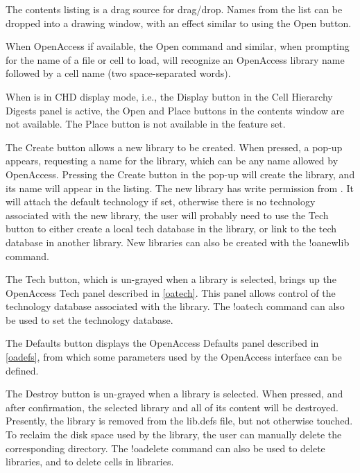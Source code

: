 The contents listing is a drag source for drag/drop.  Names from the
list can be dropped into a drawing window, with an effect similar to
using the {\cb Open} button.

When OpenAccess if available, the {\cb Open} command and similar, when
prompting for the name of a file or cell to load, will recognize an
OpenAccess library name followed by a cell name (two space-separated
words).

When {\Xic} is in CHD display mode, i.e., the {\cb Display} button in
the {\cb Cell Hierarchy Digests} panel is active, the {\cb Open} and
{\cb Place} buttons in the contents window are not available.  The
{\cb Place} button is not available in the {\Xiv} feature set.

The {\cb Create} button allows a new library to be created.  When
pressed, a pop-up appears, requesting a name for the library, which
can be any name allowed by OpenAccess.  Pressing the {\cb Create}
button in the pop-up will create the library, and its name will appear
in the listing.  The new library has write permission from {\Xic}.  It
will attach the default technology if set, otherwise there is no
technology associated with the new library, the user will probably
need to use the {\cb Tech} button to either create a local tech
database in the library, or link to the tech database in another
library.  New libraries can also be created with the {\cb !oanewlib}
command.

The {\cb Tech} button, which is un-grayed when a library is selected,
brings up the {\cb OpenAccess Tech} panel described in \ref{oatech}. 
This panel allows control of the technology database associated with
the library.  The {\cb !oatech} command can also be used to set the
technology database.

The {\cb Defaults} button displays the {\cb OpenAccess Defaults} panel
described in \ref{oadefs}, from which some parameters used by the
OpenAccess interface can be defined.

The {\cb Destroy} button is un-grayed when a library is selected. 
When pressed, and after confirmation, the selected library and all of
its content will be destroyed.  Presently, the library is removed from
the {\vt lib.defs} file, but not otherwise touched.  To reclaim the
disk space used by the library, the user can manually delete the
corresponding directory.  The {\cb !oadelete} command can also be used
to delete libraries, and to delete cells in libraries.
\fi

\ifoa
